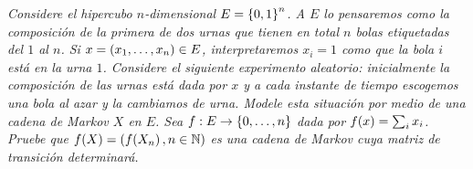 \emph{
	Considere el hipercubo $n$-dimensional $E=\left\{ 0,1\right\} ^n$. A $E$ lo pensaremos como la composici\'on 
	de la primera de dos urnas que tienen en total $n$ bolas etiquetadas del $1$ al $n$. 
	Si $x=\left( x_1,\ldots, x_n\right) \in E$, interpretaremos $x_i=1$ como que la bola $i$ est\'a en la urna $1$. 
	Considere el siguiente experimento aleatorio: inicialmente la composici\'on de las urnas est\'a dada por 
	$x$ y a cada instante de tiempo escogemos una bola al azar y la cambiamos de urna. 
	Modele esta situaci\'on por medio de una cadena de Markov $X$ en $E$. Sea $f:E\to \left\{ 0,\ldots, n\right\} $ 
	dada por $f\!\left( x\right) =\sum_i x_i$. Pruebe que $f\!\left( X\right) =\left( f\!\left( X_n\right) ,n\in\mathbb{N}\right) $ es una cadena de 
	Markov cuya matriz de transici\'on determinar\'a.
}